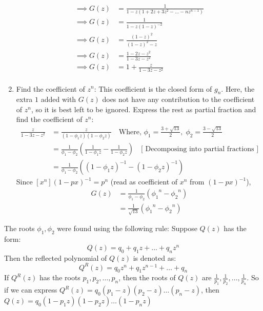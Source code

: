 \begin{enumerate}[label=(\arabic*)]
\begin{align*}
              \implies G(z) & = \frac{1}{1-z(1+2z+3z^2-\ldots-nz^{n-1})}  \\
              \implies G(z) & = \frac{1}{1-z(1-z)^{-2}}                   \\
              \implies G(z) & = \frac{(1-z)^2}{(1-z)^2-z}                 \\
              \implies G(z) & = \frac{1-2z-z^2}{1-3z-z^2}                 \\
              \implies G(z) & = 1 + \frac{z}{1-3z-z^2}                    \\
          \end{align*}
          \endgroup
    \item Find the coefficient of $z^n$: This coefficient is the closed form of $g_n$. Here, the extra $1$ added with $G(z)$ does not have any contribution to the coefficient of $z^n$, so it is best left to be ignored. Express the rest as partial fraction and find the coefficient of $z^n$:
          \begin{align*}
              \frac{z}{1-3z-z^2} & =\frac{z}{(1-\phi_1z)(1-\phi_2z)} \quad \text{Where, } \phi_1=\frac{3+\sqrt{13}}{2},\;\phi_2=\frac{3-\sqrt{13}}{2}               \\
                                 & =\frac{1}{\phi_1-\phi_2}\left(\frac{1}{1-\phi_1z}-\frac{1}{1-\phi_2z}\right) \quad \text{[ Decomposing into partial fractions ]} \\
                                 & =\frac{1}{\phi_1-\phi_2}\left(\left(1-\phi_1z\right)^{-1} - \left(1-\phi_2z\right)^{-1} \right)
          \end{align*}
          Since $[x^n](1-px)^{-1} = p^n$ (read as coefficient of $x^n$ from $(1-px)^{-1}$),
          \begin{align*}
              [z^n]G(z) & = \frac{1}{\phi_1-\phi_2}\left({\phi_1}^n - {\phi_2}^n\right) \\
                        & =\frac{1}{\sqrt{13}}\left({\phi_1}^n - {\phi_2}^n\right)
          \end{align*}
\end{enumerate}
The roots $\phi_1, \phi_2$ were found using the following rule: Suppose $Q(z)$ has the form:
\[
    Q(z) = q_0 + q_1z + \ldots + q_nz^n
\]
Then the reflected polynomial of $Q(z)$ is denoted as:
\[
    Q^R(z) = q_0z^n + q_1z^{n-1} + \ldots + q_n
\]
If $Q^R(z)$ has the roots $p_1, p_2, \ldots, p_n$, then the roots of $Q(z)$ are $\frac{1}{p_1}, \frac{1}{p_2}, \ldots, \frac{1}{p_n}$. So if we can express $Q^R(z)=q_0(p_1-z)(p_2-z)\ldots(p_n-z)$, then $Q(z)=q_0(1-p_1z)(1-p_2z)\ldots(1-p_nz)$
